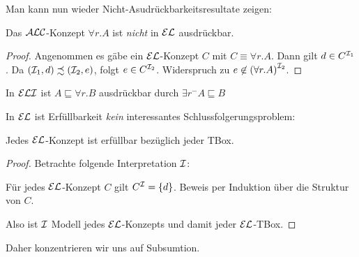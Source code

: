 Man kann nun wieder Nicht-Asudrückbarkeitsresultate zeigen:
\begin{lemma}
    Das $\mathcal{A}\mathcal{L}\mathcal{C}$-Konzept $\forall r.A$ ist \emph{nicht} in $\mathcal{E}\mathcal{L}$ ausdrückbar.
\end{lemma}
\begin{tafel}[continues=t:63]
    \begin{proof}
        Angenommen es gäbe ein $\mathcal{E}\mathcal{L}$-Konzept $C$ mit $C \equiv \forall r.A$.
        Dann gilt $d \in C^{\mathcal{I}_1}$. Da $(\mathcal{I}_1, d) \precsim (\mathcal{I}_2, e)$,
        folgt $e \in C^{\mathcal{I}_2}$. Widerspruch zu $e \not\in {(\forall
        r.A)}^{\mathcal{I}_2}$.
    \end{proof}
    In $\mathcal{E}\mathcal{L}\mathcal{I}$ ist $A \sqsubseteq \forall r.B$ ausdrückbar durch $\exists r^- A \sqsubseteq B$
\end{tafel}

In $\mathcal{E}\mathcal{L}$ ist Erfüllbarkeit \emph{kein} interessantes Schlussfolgerungsproblem:

\begin{lemma}
    Jedes $\mathcal{E}\mathcal{L}$-Konzept ist erfüllbar bezüglich jeder TBox.
\end{lemma}

\begin{tafel}
    \begin{proof}
    Betrachte folgende Interpretation $\mathcal{I}$:

    \begin{center}
    \end{center}

Für jedes $\mathcal{E}\mathcal{L}$-Konzept $C$ gilt $C^{\mathcal{I}} = \{d\}$. Beweis per Induktion über
die Struktur von $C$.

Also ist $\mathcal{I}$ Modell jedes $\mathcal{E}\mathcal{L}$-Konzepts und damit jeder $\mathcal{E}\mathcal{L}$-TBox.
\end{proof}
\end{tafel}

Daher konzentrieren wir uns auf Subsumtion.

